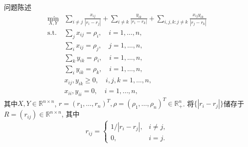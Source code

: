 \documentclass{beamer}
\newcommand{\st}{\mathrm{s.t.}}
\begin{document}
\begin{frame}{问题陈述}
	\begin{equation}
		\begin{array}{rl}
			\min\limits_{X,Y} & \sum\limits_{i\ne j}\frac{x_{ij}}{|r_i-r_j|}+\sum\limits_{i\ne k}\frac{y_{ik}}{|r_i-r_k|}+\sum\limits_{i,j,k:j\ne k}\frac{x_{ij}y_{ik}}{|r_j-r_k|}\\
			\st & \sum\limits_jx_{ij}=\rho_i,\quad i=1,\ldots,n,\\
			 & \sum\limits_ix_{ij}=\rho_j,\quad j=1,\ldots,n,\\
			 & \sum\limits_ky_{ik}=\rho_i,\quad i=1,\ldots,n,\\
			 & \sum\limits_iy_{ik}=\rho_k,\quad i=1,\ldots,n,\\
			 & x_{ij},y_{ik}\ge0,\quad i,j,k=1,\ldots,n,\\
			 & x_{ii},y_{ii}=0,\quad i=1,\ldots,n,
		\end{array}
		\label{original problem element form}
	\end{equation}
	其中$X,Y\in\mathbb{R}^{n\times n}$, $r=(r_1,\ldots,r_n)^T,\rho=(\rho_1,\ldots,\rho_n)^T\in\mathbb{R}_+^n$. 将$\{|r_i-r_j|\}$储存于$R=(r_{ij})\in\mathbb{R}^{n\times n}$, 其中
	$$r_{ij}=\left\{\begin{array}{ll}
		1/|r_i-r_j|, & i\ne j,\\
		0, & i=j.
	\end{array}\right.$$
\end{frame}
\end{document}

